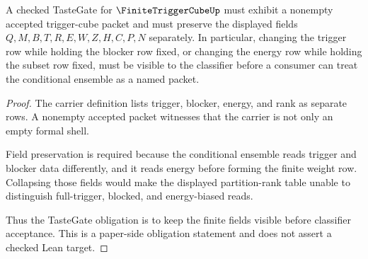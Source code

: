 

\begin{theorem}
\label{thm:finite-trigger-cube-tastegate-obligations}
A checked TasteGate for $\FiniteTriggerCubeUp$ must exhibit a nonempty accepted trigger-cube packet and must preserve the displayed fields $Q,M,B,T,R,E,W,Z,H,C,P,N$ separately. In particular, changing the trigger row while holding the blocker row fixed, or changing the energy row while holding the subset row fixed, must be visible to the classifier before a consumer can treat the conditional ensemble as a named packet.
\end{theorem}
\begin{proof}
The carrier definition lists trigger, blocker, energy, and rank as separate rows. A nonempty accepted packet witnesses that the carrier is not only an empty formal shell.

Field preservation is required because the conditional ensemble reads trigger and blocker data differently, and it reads energy before forming the finite weight row. Collapsing those fields would make the displayed partition-rank table unable to distinguish full-trigger, blocked, and energy-biased reads.

Thus the TasteGate obligation is to keep the finite fields visible before classifier acceptance. This is a paper-side obligation statement and does not assert a checked Lean target.
\end{proof}


